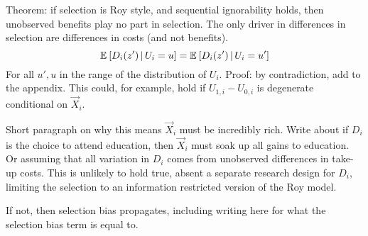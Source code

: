 Theorem: if selection is Roy style, and sequential ignorability holds, then unobserved benefits play no part in selection.
The only driver in differences in selection are differences in costs (and not benefits).
\[ \mathbb{E}_{} \left[  D_i(z')  \, \middle\vert \,  U_i = u \right] = \mathbb{E}_{} \left[  D_i(z')  \, \middle\vert \,  U_i = u' \right] \]
For all $u', u$ in the range of the distribution of $U_i$.
Proof: by contradiction, add to the appendix.
This could, for example, hold if $U_{1,i} - U_{0,i}$ is degenerate conditional on $\vec X_i$.

Short paragraph on why this means $\vec X_i$ must be incredibly rich.
Write about if $D_i$ is the choice to attend education, then $\vec X_i$ must soak up all gains to education.
Or assuming that all variation in $D_i$ comes from unobserved differences in take-up costs.
This is unlikely to hold true, absent a separate research design for $D_i$, limiting the selection to an information restricted version of the Roy model.

If not, then selection bias propagates, including writing here for what the selection bias term is equal to. 

% 
% 
% 
% 